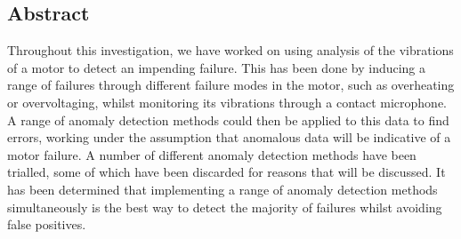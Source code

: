 	\title{\normalfont{}}
	\author{\\
		\\ {\textit{Department of Physics, Durham University}}}
	\date{\today}
\maketitle
	
\begin{center}
	\begin{tcolorbox}[colback=white,width=\textwidth,colframe=white]
		\section*{\large Abstract}
		\small
		Throughout this investigation, we have worked on using analysis of the vibrations of a motor to detect an impending failure. This has been done by inducing a range of failures through different failure modes in the motor, such as overheating or overvoltaging, whilst monitoring its vibrations through a contact microphone. A range of anomaly detection methods could then be applied to this data to find errors, working under the assumption that anomalous data will be indicative of a motor failure. A number of different anomaly detection methods have been trialled, some of which have been discarded for reasons that will be discussed. It has been determined that implementing a range of anomaly detection methods simultaneously is the best way to detect the majority of failures whilst avoiding false positives.
	\end{tcolorbox}
\end{center}
		
\newpage

\tableofcontents
\clearpage
\listoffigures
\listoftables
\clearpage
